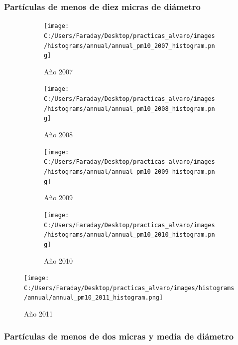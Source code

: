 \documentclass[12pt]{article}
\begin{document}
\subsubsection*{Partículas de menos de diez micras de diámetro}
%

\begin{figure}[H]
\centering
\begin{subfigure}[h]{0.45\textwidth}
\texttt{[image: C:/Users/Faraday/Desktop/practicas\_alvaro/images/histograms/annual/annual\_pm10\_2007\_histogram.png]}
\caption{Año 2007}
\label{fig:hist-ann-3-1}
\end{subfigure}
%
\begin{subfigure}[H]{0.45\textwidth}
\texttt{[image: C:/Users/Faraday/Desktop/practicas\_alvaro/images/histograms/annual/annual\_pm10\_2008\_histogram.png]}
\caption{Año 2008}
\label{fig:hist-ann-3-2}
\end{subfigure}
\caption{}
\end{figure}

\begin{figure}[H]
\centering
\begin{subfigure}[h]{0.45\textwidth}
\texttt{[image: C:/Users/Faraday/Desktop/practicas\_alvaro/images/histograms/annual/annual\_pm10\_2009\_histogram.png]}
\caption{Año 2009}
\label{fig:hist-ann-3-3}
\end{subfigure}
%
\begin{subfigure}[H]{0.45\textwidth}
\texttt{[image: C:/Users/Faraday/Desktop/practicas\_alvaro/images/histograms/annual/annual\_pm10\_2010\_histogram.png]}
\caption{Año 2010}
\label{fig:hist-ann-3-4}
\end{subfigure}
\caption{}
\end{figure}

\begin{figure}[H]
\centering
\texttt{[image: C:/Users/Faraday/Desktop/practicas\_alvaro/images/histograms/annual/annual\_pm10\_2011\_histogram.png]}
\label{fig:hist-ann-3-5}
\caption{Año 2011}
\end{figure}

\newpage

\subsubsection*{Partículas de menos de dos micras y media de diámetro}
%
\end{document}
